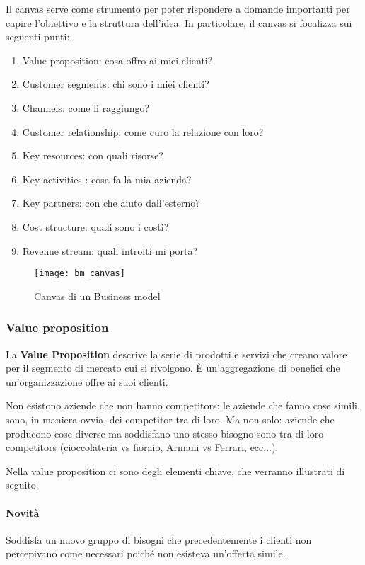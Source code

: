 Il canvas serve come strumento per poter rispondere a domande importanti per
capire l'obiettivo e la struttura dell'idea. In particolare, il
canvas si focalizza sui seguenti punti:
\begin{enumerate}
 \item Value proposition: cosa offro ai miei clienti?
 \item Customer segments: chi sono i miei clienti?
 \item Channels: come li raggiungo?
 \item Customer relationship: come curo la relazione con loro?
  \item Key resources: con quali risorse?
 \item Key activities : cosa fa la mia azienda?
 \item Key partners: con che aiuto dall'esterno?
 \item Cost structure: quali sono i costi?
 \item Revenue stream: quali introiti mi porta?
\end{enumerate}

\begin{figure}[t]
 \centering
 \texttt{[image: bm\_canvas]}
 \caption{Canvas di un Business model}
 \label{fig:bm:bm}
\end{figure}

\subsubsection{Value proposition}

\begin{definition}
La \textbf{Value Proposition} descrive la serie di prodotti e servizi che
creano valore per il segmento di mercato cui si rivolgono. È un'aggregazione di
benefici che un'organizzazione offre ai suoi clienti.
\end{definition}

Non esistono aziende che non hanno competitors: le aziende che fanno cose
simili, sono, in maniera ovvia, dei competitor tra di loro. Ma non solo:
aziende che producono cose diverse ma soddisfano uno stesso bisogno sono tra di
loro competitors (cioccolateria vs fioraio, Armani vs Ferrari, ecc...).

Nella value proposition ci sono degli elementi chiave, che verranno illustrati
di seguito.

\paragraph*{Novità} Soddisfa un nuovo gruppo di bisogni che precedentemente i
clienti non percepivano come necessari poiché non esisteva un'offerta simile.

